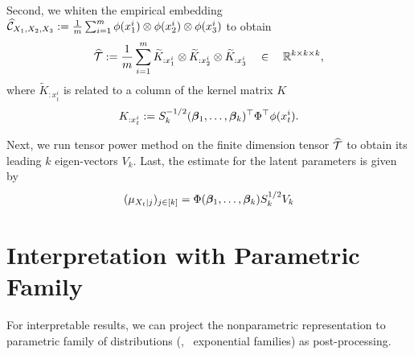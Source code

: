 \documentclass[11pt]{article}
\begin{document}
Second, we   whiten the empirical embedding $\widehat {\mathcal{C}}_{X_1,X_2,X_3}:=\frac{1}{m}\sum_{i=1}^m \phi(x_1^i) \otimes \phi(x_2^i) \otimes \phi(x_3^i)$ to obtain
\begin{align}
	\widehat {{\mathcal{T}}} := \frac{1}{m}\sum_{i=1}^m \widetilde K_{:x_1^i} \otimes \widetilde K_{:x_2^i} \otimes \widetilde K_{:x_3^i} \quad \in \quad \mathbb{R}^{k\times k \times k},
\end{align}
where $\widetilde K_{:x_t^i}$ is related to a column of the kernel matrix $K$
$$
	K_{:x_t^i} := S_k^{-1/2} (\boldsymbol{\beta}_1,\ldots,\boldsymbol{\beta}_k)^\top \Phi^\top \phi(x_t^i).
$$

Next, we run tensor power method on the finite dimension tensor $\widehat {{\mathcal{T}}}$ to obtain its leading $k$ eigen-vectors $V_k$. Last, the estimate for the latent parameters is given by
\begin{align}
	(\mu_{X_t|j})_{j\in[k]} = \Phi (\boldsymbol{\beta}_1,\ldots,\boldsymbol{\beta}_k) S_k^{1/2} V_k
\end{align}

\section{Interpretation with Parametric Family}

For interpretable results, we can project the nonparametric representation to parametric family of distributions (\eg, \, exponential families) as post-processing.




\end{document}
